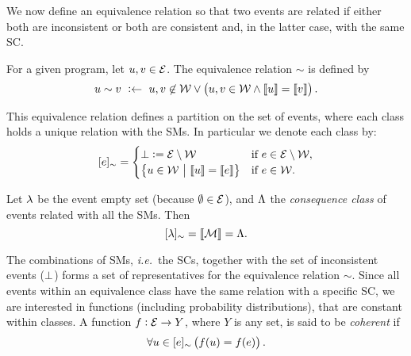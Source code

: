 \documentclass[x11names]{tlp}
\begin{document}
We now define an equivalence relation so that two events are related if
either both are inconsistent or both are consistent and, in the latter case,
with the same \acl{SC}.
\begin{definition}\label{def:equiv.rel}

	For a given program, let $u, v \in \EVENTSset$. The equivalence relation
	$\sim$ is defined by
	\begin{equation}
		u \sim v\ :\clause\ u,v \not\in\CONSISTset \vee \del{u,v \in \CONSISTset \wedge \stablecore{u} = \stablecore{v}}.\label{eq:equiv.rel}
	\end{equation}

\end{definition}

This equivalence relation defines a partition on the set of events, where
each class holds a unique relation with the \aclp{SM}. In particular we
denote each class by:
\begin{equation}
	\class{e} =
	\begin{cases}
		\inconsistent := \EVENTSset \setminus \CONSISTset
		 & \text{if~} e \in \EVENTSset \setminus \CONSISTset, %
		\\
		\set{u \in \CONSISTset \given \stablecore{u} = \stablecore{e}}
		 & \text{if~} e \in \CONSISTset.
	\end{cases}\label{eq:event.class}
\end{equation}

\begin{proposition}
	\label{prop:consequence.class}
	Let $\lambda$ be the event empty set (because
	$\emptyset \in \EVENTSset$), and $\Lambda$ the
	\emph{consequence class} of events related with all the
	\aclp{SM}.  Then
	\begin{equation}
		\class{\emptyevent} = \stablecore{\MODELset} = \consequenceclass.
	\end{equation}
\end{proposition}

The combinations of \aclp{SM}, \textit{i.e.}~the \aclp{SC}, together with the
set of inconsistent events ($\bot$) forms a set of representatives
for the equivalence relation $\sim$. Since all events within an equivalence
class have the same relation with a specific \acl{SC}, we are interested in
functions (including probability distributions), that are constant within
classes. A function $f:\EVENTSset\to Y$, where $Y$ is any set, is said to be
\emph{coherent} if
\begin{equation}
	\forall u\in \class{e} \left( f\at{u} = f\at{e} \right).
\end{equation}
\end{document}
